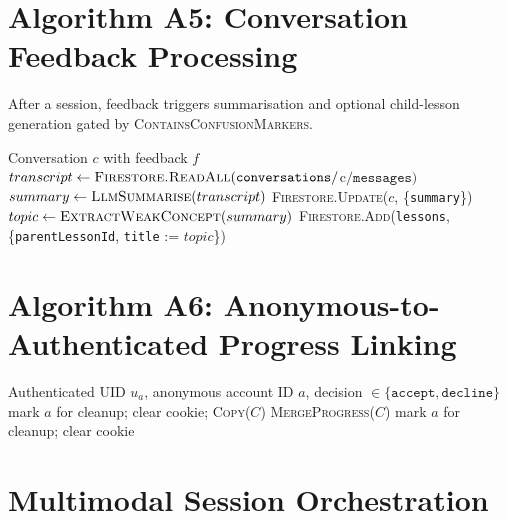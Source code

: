 \section{Algorithm A5: Conversation Feedback Processing}
\label{sec:algo-a5}

After a session, feedback triggers summarisation and optional child-lesson generation gated by \textsc{ContainsConfusionMarkers}.

\begin{algorithm}[H]
\caption{OnConversationFeedbackUpdated}
\label{alg:a5}
\begin{algorithmic}[1]
\Require Conversation $c$ with feedback $f$
\State $transcript \gets \textsc{Firestore.ReadAll}(\texttt{conversations}/$c$/\texttt{messages})$
\State $summary \gets \textsc{LlmSummarise}(transcript)$
\State \textsc{Firestore.Update}($c$, \{\texttt{summary}\})
    \State $topic \gets \textsc{ExtractWeakConcept}(summary)$
    \State \textsc{Firestore.Add}(\texttt{lessons}, \{\texttt{parentLessonId}, \texttt{title} := $topic$\})
\EndIf
\end{algorithmic}
\end{algorithm}

\section{Algorithm A6: Anonymous-to-Authenticated Progress Linking}
\label{sec:algo-a6}

\begin{algorithm}[H]
\caption{LinkAnonymousProgress}
\label{alg:a6}
\begin{algorithmic}[1]
\Require Authenticated UID $u_a$, anonymous account ID $a$, decision $\in \{\texttt{accept}, \texttt{decline}\}$
 \State mark $a$ for cleanup; clear cookie; \Return \EndIf
{}
     \State \textsc{Copy}($C$)
    \Else \State \textsc{MergeProgress}($C$) 
    \EndIf
\EndFor
\State mark $a$ for cleanup; clear cookie
\end{algorithmic}
\end{algorithm}

\section{Multimodal Session Orchestration}
\label{sec:orchestration}

